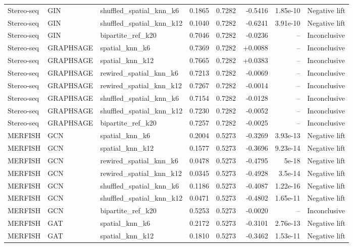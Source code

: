 \begin{longtable}{lllrrrrl}
Stereo-seq & GIN & shuffled\_spatial\_knn\_k6 & 0.1865 & 0.7282 & -0.5416 & 1.85e-10 & Negative lift \\
Stereo-seq & GIN & shuffled\_spatial\_knn\_k12 & 0.1040 & 0.7282 & -0.6241 & 3.91e-10 & Negative lift \\
Stereo-seq & GIN & bipartite\_ref\_k20 & 0.7046 & 0.7282 & -0.0236 & -- & Inconclusive \\
Stereo-seq & GRAPHSAGE & spatial\_knn\_k6 & 0.7369 & 0.7282 & +0.0088 & -- & Inconclusive \\
Stereo-seq & GRAPHSAGE & spatial\_knn\_k12 & 0.7665 & 0.7282 & +0.0383 & -- & Inconclusive \\
Stereo-seq & GRAPHSAGE & rewired\_spatial\_knn\_k6 & 0.7213 & 0.7282 & -0.0069 & -- & Inconclusive \\
Stereo-seq & GRAPHSAGE & rewired\_spatial\_knn\_k12 & 0.7267 & 0.7282 & -0.0014 & -- & Inconclusive \\
Stereo-seq & GRAPHSAGE & shuffled\_spatial\_knn\_k6 & 0.7154 & 0.7282 & -0.0128 & -- & Inconclusive \\
Stereo-seq & GRAPHSAGE & shuffled\_spatial\_knn\_k12 & 0.7230 & 0.7282 & -0.0052 & -- & Inconclusive \\
Stereo-seq & GRAPHSAGE & bipartite\_ref\_k20 & 0.7257 & 0.7282 & -0.0025 & -- & Inconclusive \\
MERFISH & GCN & spatial\_knn\_k6 & 0.2004 & 0.5273 & -0.3269 & 3.93e-13 & Negative lift \\
MERFISH & GCN & spatial\_knn\_k12 & 0.1577 & 0.5273 & -0.3696 & 9.23e-14 & Negative lift \\
MERFISH & GCN & rewired\_spatial\_knn\_k6 & 0.0478 & 0.5273 & -0.4795 & 5e-18 & Negative lift \\
MERFISH & GCN & rewired\_spatial\_knn\_k12 & 0.0345 & 0.5273 & -0.4928 & 3.5e-14 & Negative lift \\
MERFISH & GCN & shuffled\_spatial\_knn\_k6 & 0.1186 & 0.5273 & -0.4087 & 1.22e-16 & Negative lift \\
MERFISH & GCN & shuffled\_spatial\_knn\_k12 & 0.0471 & 0.5273 & -0.4802 & 1.65e-11 & Negative lift \\
MERFISH & GCN & bipartite\_ref\_k20 & 0.5253 & 0.5273 & -0.0020 & -- & Inconclusive \\
MERFISH & GAT & spatial\_knn\_k6 & 0.2172 & 0.5273 & -0.3101 & 2.76e-13 & Negative lift \\
MERFISH & GAT & spatial\_knn\_k12 & 0.1810 & 0.5273 & -0.3462 & 1.53e-11 & Negative lift \\

\end{longtable}
